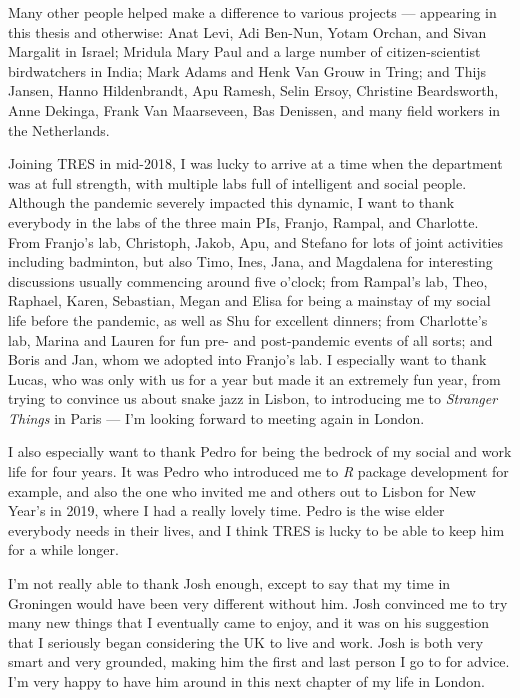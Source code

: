 Many other people helped make a difference to various projects --- appearing in this thesis and otherwise: Anat Levi, Adi Ben-Nun, Yotam Orchan, and Sivan Margalit in Israel; Mridula Mary Paul and a large number of citizen-scientist birdwatchers in India; Mark Adams and Henk Van Grouw in Tring; and Thijs Jansen, Hanno Hildenbrandt, Apu Ramesh, Selin Ersoy, Christine Beardsworth, Anne Dekinga, Frank Van Maarseveen, Bas Denissen, and many field workers in the Netherlands.

\medskip

Joining TRES in mid-2018, I was lucky to arrive at a time when the department was at full strength, with multiple labs full of intelligent and social people.
Although the pandemic severely impacted this dynamic, I want to thank everybody in the labs of the three main PIs, Franjo, Rampal, and Charlotte.
From Franjo's lab, Christoph, Jakob, Apu, and Stefano for lots of joint activities including badminton, but also Timo, Ines, Jana, and Magdalena for interesting discussions usually commencing around five o'clock;
from Rampal's lab, Theo, Raphael, Karen, Sebastian, Megan and Elisa for being a mainstay of my social life before the pandemic, as well as Shu for excellent dinners;
from Charlotte's lab, Marina and Lauren for fun pre- and post-pandemic events of all sorts;
and Boris and Jan, whom we adopted into Franjo's lab.
I especially want to thank Lucas, who was only with us for a year but made it an extremely fun year, from trying to convince us about snake jazz in Lisbon, to introducing me to \textit{Stranger Things} in Paris --- I'm looking forward to meeting again in London.

I also especially want to thank Pedro for being the bedrock of my social and work life for four years.
It was Pedro who introduced me to \textit{R} package development for example, and also the one who invited me and others out to Lisbon for New Year's in 2019, where I had a really lovely time.
Pedro is the wise elder everybody needs in their lives, and I think TRES is lucky to be able to keep him for a while longer.

I'm not really able to thank Josh enough, except to say that my time in Groningen would have been very different without him.
Josh convinced me to try many new things that I eventually came to enjoy, and it was on his suggestion that I seriously began considering the UK to live and work.
Josh is both very smart and very grounded, making him the first and last person I go to for advice. 
I'm very happy to have him around in this next chapter of my life in London.

